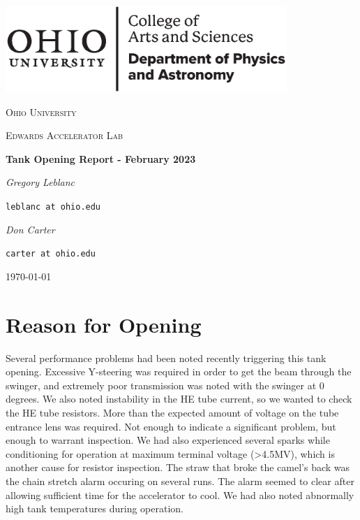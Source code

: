 \documentclass{scrartcl}
\begin{document}
\begin{titlepage}
	\centering
	\includegraphics[width=0.8\textwidth]{CAS_Physics_Astronomy_H_black.eps}\par\vspace{1cm} %
	{\scshape\Huge Ohio University \par} 
	\vspace{1cm}
	{\scshape\Large Edwards Accelerator Lab\par} 
	\vspace{1.5cm}
	{\huge\bfseries Tank Opening Report - February 2023\par} 
	\vspace{2cm}
	{\Large\itshape Gregory Leblanc}\par
	\texttt{leblanc at ohio.edu}\par 
	\vspace{0.5cm}
	{\Large\itshape Don Carter}\par
	\texttt{carter at ohio.edu}\par 
	\vfill
	\vfill

	{\large \today\par}
\end{titlepage}


\section{Reason for Opening} %

Several performance problems had been noted recently triggering this tank opening.  Excessive Y-steering 
was required in order to get the beam through the swinger, and extremely poor transmission was noted with the 
swinger at 0 degrees.  We also noted instability in the HE tube current, so we wanted to check the HE tube 
resistors. More than the expected amount of voltage on the tube entrance lens was required.  Not enough to 
indicate a significant problem, but enough to warrant inspection.  We had also experienced several sparks
while conditioning for operation at maximum terminal voltage (>4.5MV), which is another cause for resistor
inspection.  The straw that broke the camel's back was the chain stretch alarm occuring on several runs.  
The alarm seemed to clear after allowing sufficient time for the accelerator to cool.  We had also 
noted abnormally high tank temperatures during operation.
\end{document}
